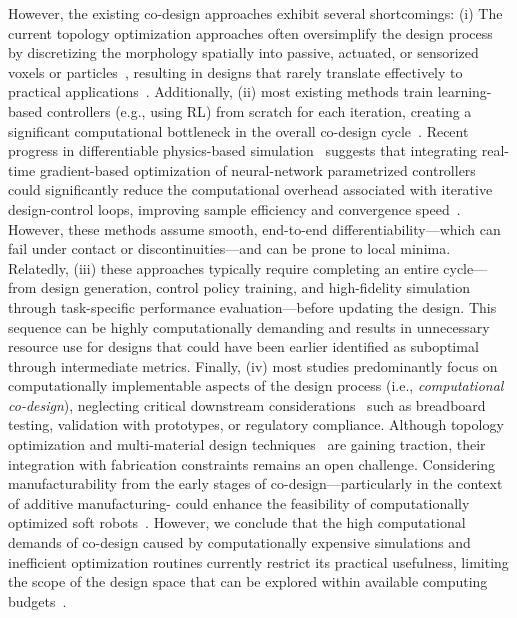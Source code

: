 However, the existing co-design approaches exhibit several shortcomings:
(i) The current topology optimization approaches often oversimplify the design process by discretizing the morphology spatially into passive, actuated, or sensorized voxels or particles~\citep{spielberg2019learning, medvet2021biodiversity, medvet2022impact, wang2022curriculum, legrand2023reconfigurable, wang2023softzoo, wang2023preco, wang2024diffusebot}, resulting in designs that rarely translate effectively to practical applications~\citep{legrand2023reconfigurable, wang2024diffusebot}. Additionally, (ii) most existing methods train learning-based controllers (e.g., using \gls{RL}) from scratch for each iteration, creating a significant computational bottleneck in the overall co-design cycle~\citep{bhatia2021evolution, wang2022curriculum, wang2023preco}. Recent progress in differentiable physics-based simulation~\citep{coevoet2017software, hu2019chainqueen, fang2020kinematics} suggests that integrating real-time gradient-based optimization of neural-network parametrized controllers could significantly reduce the computational overhead associated with iterative design-control loops, improving sample efficiency and convergence speed~\citep{spielberg2019learning, bacher2021design, wang2024diffusebot}. However, these methods assume smooth, end-to-end differentiability—which can fail under contact or discontinuities—and can be prone to local minima. 
Relatedly, (iii) these approaches typically require completing an entire cycle—from design generation, control policy training, and high-fidelity simulation through task-specific performance evaluation—before updating the design. This sequence can be highly computationally demanding and results in unnecessary resource use for designs that could have been earlier identified as suboptimal through intermediate metrics. 
Finally, (iv) most studies predominantly focus on computationally implementable aspects of the design process (i.e., \emph{computational co-design}), neglecting critical downstream considerations~\citep{junge2022leveraging} such as breadboard testing, validation with prototypes, or regulatory compliance. Although topology optimization and multi-material design techniques~\citep{chen2020design} are gaining traction, their integration with fabrication constraints remains an open challenge. Considering manufacturability from the early stages of co-design—particularly in the context of additive manufacturing- could enhance the feasibility of computationally optimized soft robots~\citep{navez2024contributions}.
However, we conclude that the high computational demands of co-design caused by computationally expensive simulations and inefficient optimization routines currently restrict its practical usefulness, limiting the scope of the design space that can be explored within available computing budgets~\citep{chen2020design}.